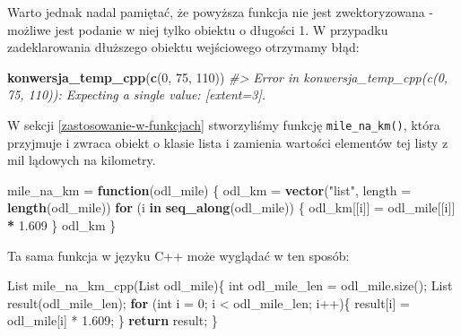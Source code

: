 \documentclass[paper=6in:9in,pagesize=pdftex,headinclude=on,footinclude=on,10pt]{scrbook}
\newenvironment{Shaded}{\begin{snugshade}}{\end{snugshade}}
\newcommand{\CommentTok}[1]{\textcolor[rgb]{0.56,0.35,0.01}{\textit{#1}}}
\newcommand{\ControlFlowTok}[1]{\textcolor[rgb]{0.13,0.29,0.53}{\textbf{#1}}}
\newcommand{\DataTypeTok}[1]{\textcolor[rgb]{0.13,0.29,0.53}{#1}}
\newcommand{\DecValTok}[1]{\textcolor[rgb]{0.00,0.00,0.81}{#1}}
\newcommand{\FloatTok}[1]{\textcolor[rgb]{0.00,0.00,0.81}{#1}}
\newcommand{\KeywordTok}[1]{\textcolor[rgb]{0.13,0.29,0.53}{\textbf{#1}}}
\newcommand{\NormalTok}[1]{#1}
\newcommand{\OperatorTok}[1]{\textcolor[rgb]{0.81,0.36,0.00}{\textbf{#1}}}
\newcommand{\StringTok}[1]{\textcolor[rgb]{0.31,0.60,0.02}{#1}}
\begin{document}
Warto jednak nadal pamiętać, że powyższa funkcja nie jest zwektoryzowana - możliwe jest podanie w niej tylko obiektu o długości 1.
W przypadku zadeklarowania dłuższego obiektu wejściowego otrzymamy błąd:

\begin{Shaded}
\begin{Highlighting}[]
\KeywordTok{konwersja_temp_cpp}\NormalTok{(}\KeywordTok{c}\NormalTok{(}\DecValTok{0}\NormalTok{, }\DecValTok{75}\NormalTok{, }\DecValTok{110}\NormalTok{))}
\CommentTok{#> Error in konwersja_temp_cpp(c(0, 75, 110)): Expecting a single value: [extent=3].}
\end{Highlighting}
\end{Shaded}

W sekcji \ref{zastosowanie-w-funkcjach} stworzyliśmy funkcję \texttt{mile\_na\_km()}, która przyjmuje i zwraca obiekt o klasie lista i zamienia wartości elementów tej listy z mil lądowych na kilometry.

\begin{Shaded}
\begin{Highlighting}[]
\NormalTok{mile_na_km =}\StringTok{ }\ControlFlowTok{function}\NormalTok{(odl_mile) \{}
\NormalTok{  odl_km =}\StringTok{ }\KeywordTok{vector}\NormalTok{(}\StringTok{"list"}\NormalTok{, }\DataTypeTok{length =} \KeywordTok{length}\NormalTok{(odl_mile))}
  \ControlFlowTok{for}\NormalTok{ (i }\ControlFlowTok{in} \KeywordTok{seq_along}\NormalTok{(odl_mile)) \{}
\NormalTok{    odl_km[[i]] =}\StringTok{ }\NormalTok{odl_mile[[i]] }\OperatorTok{*}\StringTok{ }\FloatTok{1.609}
\NormalTok{  \}}
\NormalTok{  odl_km}
\NormalTok{\}}
\end{Highlighting}
\end{Shaded}

Ta sama funkcja w języku C++ może wyglądać w ten sposób:

\begin{Shaded}
\begin{Highlighting}[]
\NormalTok{List mile_na_km_cpp(List odl_mile)\{}
  \DataTypeTok{int}\NormalTok{ odl_mile_len = odl_mile.size();}
\NormalTok{  List result(odl_mile_len);}
  \ControlFlowTok{for}\NormalTok{ (}\DataTypeTok{int}\NormalTok{ i = }\DecValTok{0}\NormalTok{; i < odl_mile_len; i++)\{}
\NormalTok{    result[i] = odl_mile[i] * }\FloatTok{1.609}\NormalTok{;}
\NormalTok{  \}}
  \ControlFlowTok{return}\NormalTok{ result;}
\NormalTok{\}}
\end{Highlighting}
\end{Shaded}
\end{document}

